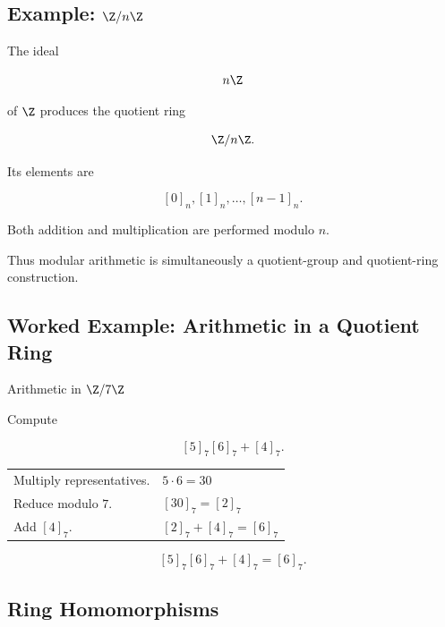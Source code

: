 \subsection{Example: \(\Z/n\Z\)}
\label{subsec:ring-z-mod-n}

The ideal

\[ n\Z \]

of \(\Z\) produces the quotient ring

\[ \Z/n\Z. \]

Its elements are

\[ [0]_n,[1]_n,\ldots,[n-1]_n. \]

Both addition and multiplication are performed modulo \(n\).

Thus modular arithmetic is simultaneously a quotient-group and quotient-ring
construction.

\subsection{Worked Example: Arithmetic in a Quotient Ring}
\label{subsec:worked-quotient-ring}

\begin{workedexamplebox}{Arithmetic in \(\Z/7\Z\)}

Compute

\[ [5]_7[6]_7+[4]_7. \]

\begin{tabularx}{\textwidth}{@{}>{\raggedright\arraybackslash}p{}X@{}}
Multiply representatives. & \(5\cdot6=30\)\\
Reduce modulo \(7\). & \([30]_7=[2]_7\)\\
Add \([4]_7\). & \([2]_7+[4]_7=[6]_7\)
\end{tabularx}

\begin{answerbox}
\[ [5]_7[6]_7+[4]_7=[6]_7. \]
\end{answerbox}
\end{workedexamplebox}

\subsection{Ring Homomorphisms}
\label{subsec:ring-homomorphisms}

